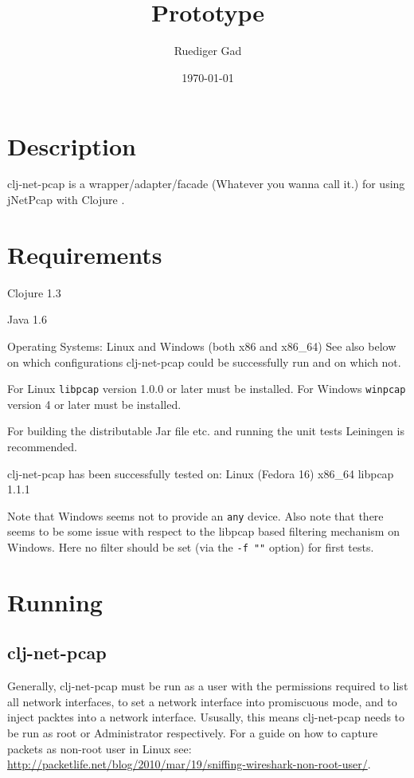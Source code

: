 \documentclass[11pt,a4paper,parskip=half]{scrartcl}
\title{
\programname\\
Prototype
}
\author{
Ruediger Gad\\
}
\date{\today}
\newcommand{\programname}{{clj-net-pcap}}
\begin{document}
\maketitle

\tableofcontents

\listoffigures

\section{Description}
\programname{} is a wrapper/adapter/facade (Whatever you wanna call it.) for using jNetPcap \cite{jnetpcap} with Clojure \cite{clojure}.

\section{Requirements}
Clojure 1.3

Java 1.6

Operating Systems: Linux and Windows (both x86 and x86\_64) 
See also below on which configurations \programname{} could be successfully run and on which not.

For Linux \texttt{libpcap}\cite{libpcap} version 1.0.0 or later must be installed.
For Windows \texttt{winpcap}\cite{winpcap} version 4 or later must be installed.

For building the distributable Jar file etc. and running the unit tests Leiningen \cite{leiningen} is recommended.

\programname{} has been successfully tested on: 
Linux (Fedora 16)  x86\_64 libpcap 1.1.1

Note that Windows seems not to provide an \texttt{any} device.
Also note that there seems to be some issue with respect to the libpcap based filtering mechanism on Windows.
Here no filter should be set (via the \texttt{-f ""} option) for first tests.

\section{Running}
\subsection{\programname{}}
\label{sec:running}
Generally, \programname{} must be run as a user with the permissions required to list all network interfaces, to set a network interface into promiscuous mode, and to inject packtes into a network interface.
Ususally, this means \programname{} needs to be run as root or Administrator respectively.
For a guide on how to capture packets as non-root user in Linux see: \url{http://packetlife.net/blog/2010/mar/19/sniffing-wireshark-non-root-user/}.
\end{document}
